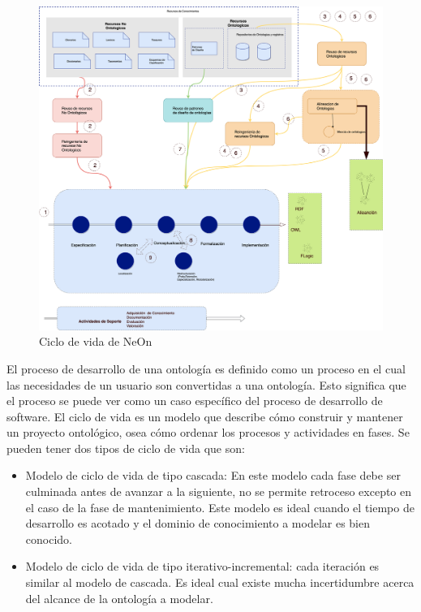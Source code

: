 \begin{figure}[h!]
    \centering
    \includegraphics[width=150mm]{figuras/Diagramas-NeonProcess}
    \caption{Ciclo de vida de NeOn \cite{Suarez-Figueroa:2012:OEN:2341178}}
    \label{img:neon ciclo de vida}
    \end{figure}

El proceso de desarrollo de una ontología es definido como un proceso en el cual las necesidades de un usuario son convertidas a una ontología. Esto significa que el proceso se puede ver como un caso específico del proceso de desarrollo de software.	
El ciclo de vida es un modelo que describe cómo construir y mantener un proyecto ontológico, osea cómo ordenar los procesos y actividades en fases. Se pueden tener dos tipos de ciclo de vida que son:

\begin{itemize}
    \item Modelo de ciclo de vida de tipo cascada: En este modelo cada fase debe ser culminada antes de avanzar a la siguiente, no se permite retroceso excepto en el caso de la fase de mantenimiento. Este modelo es ideal cuando el tiempo de desarrollo es acotado y el dominio de conocimiento a modelar es bien conocido.
    \item Modelo de ciclo de vida de tipo iterativo-incremental: cada iteración es similar al modelo de cascada. Es ideal cual existe mucha incertidumbre acerca del alcance de la ontología a modelar.
\end{itemize}

